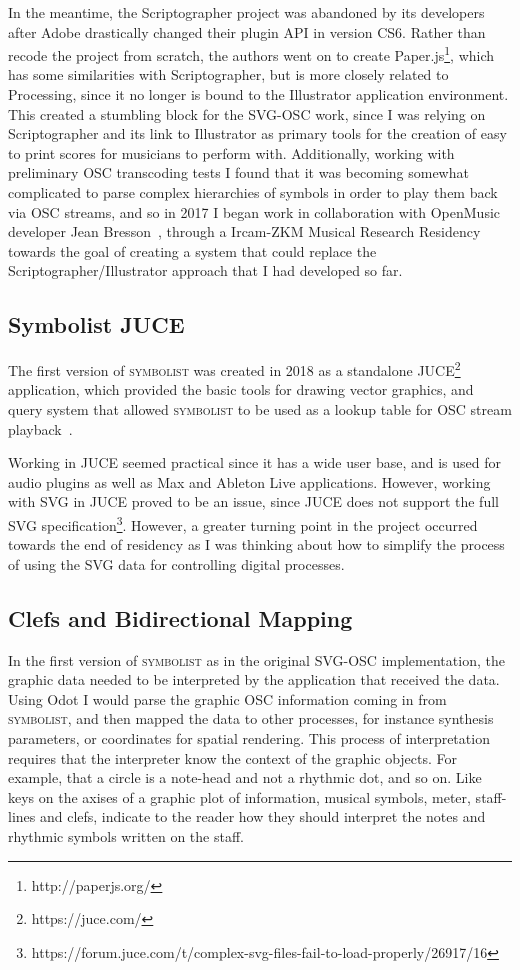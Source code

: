 \documentclass{article}
\def\symbolist{\textsc{symbolist}\xspace}
\begin{document}
In the meantime, the Scriptographer project was abandoned by its developers after Adobe drastically changed their plugin API in version CS6. Rather than recode the project from scratch, the authors went on to create Paper.js\footnote{http://paperjs.org/}, which has some similarities with Scriptographer, but is more closely related to Processing, since it no longer is bound to the Illustrator application environment. This created a stumbling block for the SVG-OSC work, since I was relying on Scriptographer and its link to Illustrator as primary tools for the creation of easy to print scores for musicians to perform with. Additionally, working with preliminary OSC transcoding tests I found that it was becoming somewhat complicated to parse complex hierarchies of symbols in order to play them back via OSC streams, and so in 2017 I began work in collaboration with OpenMusic developer Jean Bresson~\cite{bresson2011om}, through a Ircam-ZKM Musical Research Residency towards the goal of creating a system that could replace the Scriptographer/Illustrator approach that I had developed so far.

\subsection*{Symbolist JUCE}\label{sec:juce_version}

The first version of \symbolist was created in 2018 as a standalone JUCE\footnote{https://juce.com/} application, which provided the basic tools for drawing vector graphics, and query system that allowed \symbolist to be used as a lookup table for OSC stream playback~\cite{gottfried2018symbolist}.

Working in JUCE seemed practical since it has a wide user base, and is used for audio plugins as well as Max and Ableton Live applications. However, working with SVG in JUCE proved to be an issue, since JUCE does not support the full SVG specification\footnote{https://forum.juce.com/t/complex-svg-files-fail-to-load-properly/26917/16}. However, a greater turning point in the project occurred towards the end of residency as I was thinking about how to simplify the process of using the SVG data for controlling digital processes.

\subsection*{Clefs and Bidirectional Mapping}\label{sec:bidirectional_mapping}

In the first version of \symbolist as in the original SVG-OSC implementation, the graphic data needed to be interpreted by the application that received the data. Using Odot I would parse the graphic OSC information coming in from \symbolist, and then mapped the data to other processes, for instance synthesis parameters, or coordinates for spatial rendering. This process of interpretation requires that the interpreter know the context of the graphic objects. For example, that a circle is a note-head and not a rhythmic dot, and so on. Like keys on the axises of a graphic plot of information, musical symbols, meter, staff-lines and clefs, indicate to the reader how they should interpret the notes and rhythmic symbols written on the staff.
\end{document}
